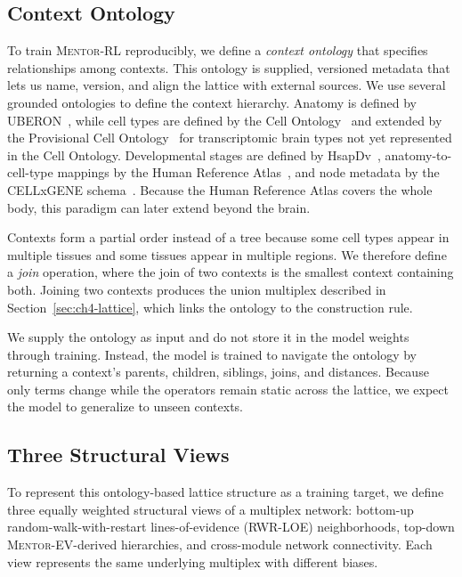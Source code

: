 \subsection{Context Ontology}\label{sec:ch4-ontology}
To train \textsc{Mentor-RL} reproducibly, we define a \textit{context ontology} that specifies relationships among contexts. This ontology is supplied, versioned metadata that lets us name, version, and align the lattice with external sources. We use several grounded ontologies to define the context hierarchy. Anatomy is defined by UBERON~\cite{uberon}, while cell types are defined by the Cell Ontology~\cite{cellontology} and extended by the Provisional Cell Ontology~\cite{pcl} for transcriptomic brain types not yet represented in the Cell Ontology. Developmental stages are defined by HsapDv~\cite{hsapdv}, anatomy-to-cell-type mappings by the Human Reference Atlas~\cite{asctb}, and node metadata by the CELLxGENE schema~\cite{cellxgene}. Because the Human Reference Atlas covers the whole body, this paradigm can later extend beyond the brain.

Contexts form a partial order instead of a tree because some cell types appear in multiple tissues and some tissues appear in multiple regions. We therefore define a \textit{join} operation, where the join of two contexts is the smallest context containing both. Joining two contexts produces the union multiplex described in Section~\ref{sec:ch4-lattice}, which links the ontology to the construction rule.

We supply the ontology as input and do not store it in the model weights through training. Instead, the model is trained to navigate the ontology by returning a context's parents, children, siblings, joins, and distances. Because only terms change while the operators remain static across the lattice, we expect the model to generalize to unseen contexts.

\subsection{Three Structural Views}\label{sec:ch4-views}
To represent this ontology-based lattice structure as a training target, we define three equally weighted structural views of a multiplex network: bottom-up random-walk-with-restart lines-of-evidence (RWR-LOE) neighborhoods, top-down \textsc{Mentor-EV}-derived hierarchies, and cross-module network connectivity. Each view represents the same underlying multiplex with different biases.

